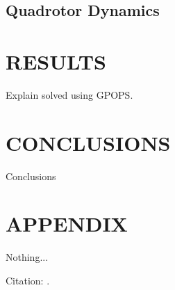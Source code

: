 \documentclass[letterpaper, 10 pt, conference]{ieeeconf}  %
\begin{document}
 \subsection{Quadrotor Dynamics}






\section{RESULTS}\label{s:exp}

Explain solved using GPOPS.

  

\section{CONCLUSIONS}\label{s:conclusions}

Conclusions

\addtolength{\textheight}{-12cm}   %

\section*{APPENDIX}

Nothing...

Citation: \cite{IEEEexample:article_typical}.


\balance

\makeatletter
\def\endthebibliography{%
	\def\@noitemerr{\@latex@warning{Empty `thebibliography' environment}}%
	\endlist
}
\makeatother



\end{document}
